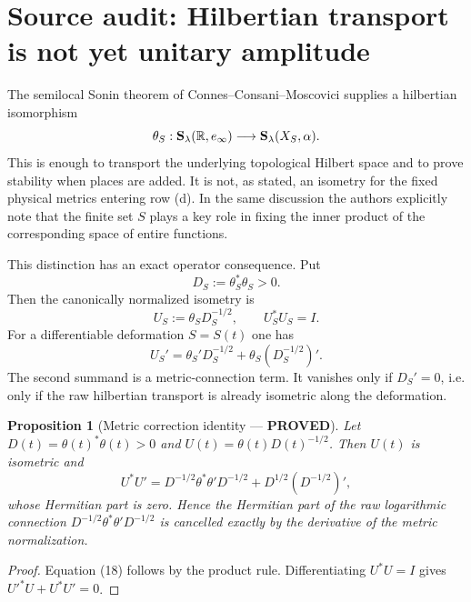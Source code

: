\documentclass[11pt]{article}
\newtheorem{proposition}[theorem]{Proposition}
\newcommand{\PROVED}{\textcolor{green!45!black}{\textbf{PROVED}}}
\begin{document}
\section{Source audit: Hilbertian transport is not yet unitary amplitude}

The semilocal Sonin theorem of Connes--Consani--Moscovici supplies a
hilbertian isomorphism
\[
 \theta_S:{\bf S}_\lambda(\mathbb R,e_\infty)
 \longrightarrow {\bf S}_\lambda(X_S,\alpha).
\]
This is enough to transport the underlying topological Hilbert space and to
prove stability when places are added.  It is not, as stated, an isometry for
the fixed physical metrics entering row (d).  In the same discussion the
authors explicitly note that the finite set $S$ plays a key role in fixing the
inner product of the corresponding space of entire functions.

This distinction has an exact operator consequence.  Put
\begin{equation}
 D_S:=\theta_S^*\theta_S>0.                               \tag{15}
\end{equation}
Then the canonically normalized isometry is
\begin{equation}
 U_S:=\theta_SD_S^{-1/2},\qquad U_S^*U_S=I.              \tag{16}
\end{equation}
For a differentiable deformation $S=S(t)$ one has
\begin{equation}
 U_S'=\theta_S'D_S^{-1/2}
       +\theta_S(D_S^{-1/2})'.                           \tag{17}
\end{equation}
The second summand is a metric-connection term.  It vanishes only if
$D_S'=0$, i.e. only if the raw hilbertian transport is already isometric along
the deformation.

\begin{proposition}[Metric correction identity --- \PROVED]
Let $D(t)=\theta(t)^*\theta(t)>0$ and
$U(t)=\theta(t)D(t)^{-1/2}$.  Then $U(t)$ is isometric and
\begin{equation}
 U^*U'=D^{-1/2}\theta^*\theta'D^{-1/2}
       +D^{1/2}(D^{-1/2})',                              \tag{18}
\end{equation}
whose Hermitian part is zero.  Hence the Hermitian part of the raw logarithmic
connection $D^{-1/2}\theta^*\theta'D^{-1/2}$ is cancelled exactly by the
derivative of the metric normalization.
\end{proposition}

\begin{proof}
Equation (18) follows by the product rule.  Differentiating $U^*U=I$ gives
$U'^*U+U^*U'=0$.
\end{proof}
\end{document}
